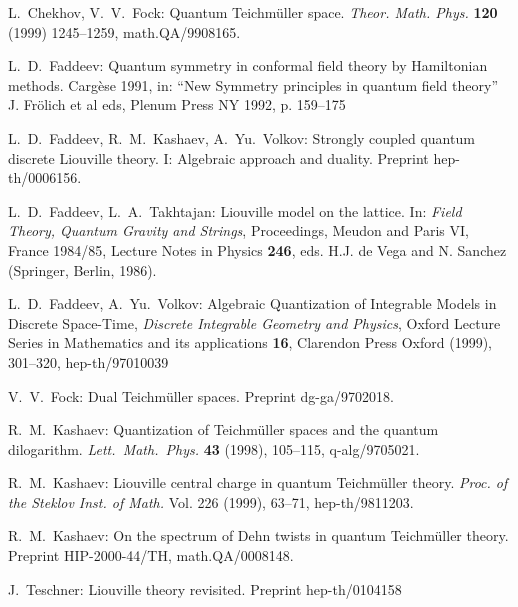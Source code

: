 \documentclass[a4paper,draft]{amsart}
\theoremstyle{definition}
\theoremstyle{remark}
\begin{document}
\begin{thebibliography}{99}


 L.~Chekhov, V.~V.~Fock: Quantum Teichm\"uller space.
  \emph{Theor. Math. Phys.} \textbf{120} (1999) 1245--1259,
  math.QA/9908165.
  

 L.~D.~Faddeev: Quantum symmetry in conformal field
  theory by Hamiltonian methods. Carg\`ese 1991, in: ``New Symmetry
  principles in quantum field theory'' J. Fr\"olich et al eds, Plenum
  Press NY 1992, p. 159--175
  
 L.~D.~Faddeev, R.~M.~Kashaev, A.~Yu.~Volkov: Strongly
  coupled quantum discrete Liouville theory. I: Algebraic approach and
  duality. Preprint hep-th/0006156.

  L.~D.~Faddeev, L.~A.~Takhtajan: Liouville model on
  the lattice. In: {\it Field Theory, Quantum Gravity and Strings},
  Proceedings, Meudon and Paris VI, France 1984/85, Lecture Notes in
  Physics {\bf 246}, eds.  H.J. de Vega and N. Sanchez (Springer,
  Berlin, 1986).

 L.~D.~Faddeev, A.~Yu.~Volkov: Algebraic
  Quantization of Integrable Models in Discrete Space-Time, {\it
    Discrete Integrable Geometry and Physics}, Oxford Lecture Series
  in Mathematics and its applications {\bf 16}, Clarendon Press Oxford
  (1999), 301--320, hep-th/97010039

 V.~V.~Fock: Dual Teichm\"uller spaces. Preprint
  dg-ga/9702018.

 R.~M.~Kashaev: Quantization of Teichm\"uller spaces and
  the quantum dilogarithm.\emph{ Lett.~Math.~Phys.} \textbf{43} (1998),
  105--115, q-alg/9705021.

R.~M.~Kashaev: Liouville central charge in quantum
  Teichm\"uller theory.  \emph{Proc. of the Steklov Inst. of Math.}
  Vol. 226 (1999), 63--71, hep-th/9811203.

R.~M.~Kashaev: On the spectrum of Dehn twists in quantum 
Teichm\"uller theory. Preprint HIP-2000-44/TH, math.QA/0008148.

  J.~Teschner: Liouville theory revisited. Preprint 
hep-th/0104158

\end{thebibliography}
\end{document}
